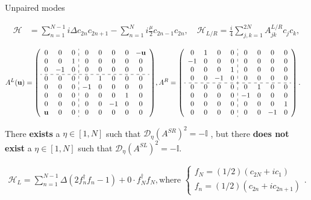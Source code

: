 \documentclass{beamer}
\begin{document}
\begin{frame}[allowframebreaks]{Unpaired modes}
\begin{small}
\begin{align}\label{eq:chain_ham}
    \mathcal{H} &= \sum_{n = 1}^{N-1}i\Delta c_{2n}c_{2n+1}-\sum_{n =1}^N i \frac{\mu}{2} c_{2n-1}c_{2n},\quad \mathcal{H}_{L/R} = \frac{i}{4}\sum_{j,k = 1}^{2N}A^{L/R}_{jk}c_jc_k,
\end{align}
 \end{small}
 
  \begin{tiny}
    \begin{align}
    A^{L}(\mathbf u) =\left(
\begin{array}{ccc:ccccc}
    0&0&0&0&0&0&0&-\mathbf{u} \\
    0&0&1&0&0&0&0&0\\
    0&-1&0&0&0&0&0&0 \\
    \hdashline
    0&0&0&0&1&0&0&0 \\
    0&0&0&-1&0&0&0&0 \\
    0&0&0&0&0&0&1&0 \\
    0&0&0&0&0&-1&0&0 \\
    \mathbf{u}&0&0&0&0&0&0&0 \\
\end{array}
\right)&, A^{R} =\left(\begin{array}{cccc:cccc}
        0&1&0&0&0&0&0&0\\
        -1&0&0&0&0&0&0&0 \\
        0&0&0&1&0&0&0&0 \\
        0&0&-1&0&0&0&0&0 \\
         \hdashline
        0&0&0&0&0&1&0&0 \\
        0&0&0&0&-1&0&0&0 \\
        0&0&0&0&0&0&0&1\\
        0&0&0&0&0&0&-1&0\\
    \end{array}\right)\label{eq:exam_mat}.
 \end{align}
 \end{tiny}
 \begin{lemma}
\label{lemma:weak_obs}
     There \textbf{exists} a $\eta \in [1,N]$ such that $\mathcal{D}_{\eta}(A^{SR})^2= -\mathbb{I}$ , but there \textbf{does not exist} a $\eta \in [1,N]$ such that $\mathcal{D}_{\eta}(A^{SL})^2 = -\mathbb{I}$.
\end{lemma}
\newpage
\begin{align}
    \mathcal{H}_L = \sum_{n =1}^{N-1}\Delta(2 f_n^\dagger f_n -1) + 0\cdot f_N^\dagger f_N, \text{where~}\begin{cases}f_N = (1/2)(c_{2N} + ic_1)\\f_n = (1/2) (c_{2n} + ic_{2n+1})\end{cases}.

\end{align}
\end{frame}
\end{document}
